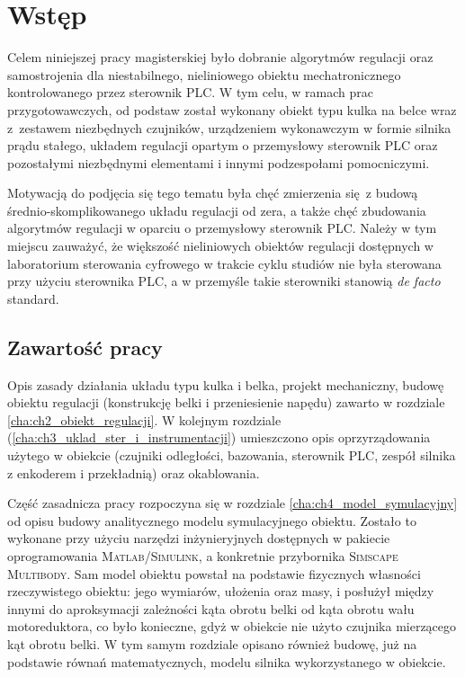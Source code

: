 \chapter{Wstęp}
\label{cha:ch1_wstep}

Celem niniejszej pracy magisterskiej było dobranie algorytmów regulacji oraz samostrojenia dla niestabilnego, nieliniowego obiektu mechatronicznego kontrolowanego przez sterownik PLC. W tym celu, w ramach prac przygotowawczych, od podstaw został wykonany obiekt typu kulka na belce wraz z~zestawem niezbędnych czujników, urządzeniem wykonawczym w formie silnika prądu stałego, układem regulacji opartym o przemysłowy sterownik PLC oraz pozostałymi niezbędnymi elementami i innymi podzespołami pomocniczymi.

Motywacją do podjęcia się tego tematu była chęć zmierzenia się z budową średnio-skomplikowanego układu regulacji od zera, a także chęć zbudowania algorytmów regulacji w oparciu o przemysłowy sterownik PLC. Należy w tym miejscu zauważyć, że większość nieliniowych obiektów regulacji dostępnych w laboratorium sterowania cyfrowego w trakcie cyklu studiów nie była sterowana przy użyciu sterownika PLC, a w przemyśle takie sterowniki stanowią \textit{de facto} standard.


\section{Zawartość pracy}

Opis zasady działania układu typu kulka i belka, projekt mechaniczny, budowę obiektu regulacji (konstrukcję belki i przeniesienie napędu) zawarto w rozdziale \ref{cha:ch2_obiekt_regulacji}. W kolejnym rozdziale (\ref{cha:ch3_uklad_ster_i_instrumentacji}) umieszczono opis oprzyrządowania użytego w obiekcie (czujniki odległości, bazowania, sterownik PLC, zespół silnika z enkoderem i przekładnią) oraz okablowania.

Część zasadnicza pracy rozpoczyna się w rozdziale \ref{cha:ch4_model_symulacyjny} od opisu budowy analitycznego modelu symulacyjnego obiektu. Zostało to wykonane przy użyciu narzędzi inżynieryjnych dostępnych w pakiecie oprogramowania \textsc{Matlab/Simulink}, a konkretnie przybornika \textsc{Simscape Multibody}. Sam model obiektu powstał na podstawie fizycznych własności rzeczywistego obiektu: jego wymiarów, ułożenia oraz masy, i posłużył między innymi do aproksymacji zależności kąta obrotu belki od kąta obrotu wału motoreduktora, co było konieczne, gdyż w obiekcie nie użyto czujnika mierzącego kąt obrotu belki. W tym samym rozdziale opisano również budowę, już na podstawie równań matematycznych, modelu silnika wykorzystanego w obiekcie.

